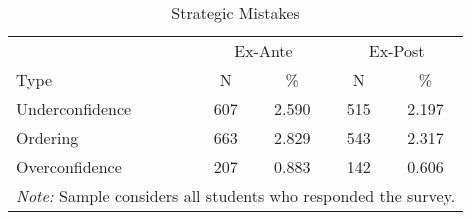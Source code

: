 \begin{table}[!htp]

\caption{Strategic Mistakes \label{tab: summary strategic mistakes}}
\centering
\begin{tabular}[t]{lcccc}
\toprule
\multicolumn{1}{c}{ } & \multicolumn{2}{c}{Ex-Ante} & \multicolumn{2}{c}{Ex-Post} \\
\cmidrule(l{3pt}r{3pt}){2-3} \cmidrule(l{3pt}r{3pt}){4-5}
Type & N & \% & N & \%\\
\midrule
Underconfidence & 607 & 2.590 & 515 & 2.197\\
Ordering & 663 & 2.829 & 543 & 2.317\\
Overconfidence & 207 & 0.883 & 142 & 0.606\\
\bottomrule
\multicolumn{5}{l}{\rule{0pt}{1em}\textit{Note:} Sample considers all students who responded the survey.}\\
\end{tabular}
\end{table}
